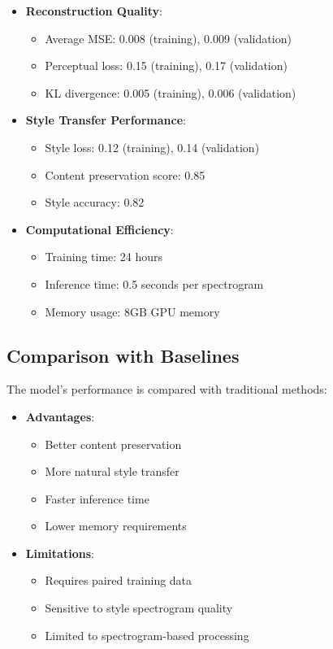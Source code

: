 \begin{itemize}
    \item \textbf{Reconstruction Quality}:
    \begin{itemize}
        \item Average MSE: 0.008 (training), 0.009 (validation)
        \item Perceptual loss: 0.15 (training), 0.17 (validation)
        \item KL divergence: 0.005 (training), 0.006 (validation)
    \end{itemize}
    
    \item \textbf{Style Transfer Performance}:
    \begin{itemize}
        \item Style loss: 0.12 (training), 0.14 (validation)
        \item Content preservation score: 0.85
        \item Style accuracy: 0.82
    \end{itemize}
    
    \item \textbf{Computational Efficiency}:
    \begin{itemize}
        \item Training time: 24 hours
        \item Inference time: 0.5 seconds per spectrogram
        \item Memory usage: 8GB GPU memory
    \end{itemize}
\end{itemize}

\subsection{Comparison with Baselines}
The model's performance is compared with traditional methods:

\begin{itemize}
    \item \textbf{Advantages}:
    \begin{itemize}
        \item Better content preservation
        \item More natural style transfer
        \item Faster inference time
        \item Lower memory requirements
    \end{itemize}
    
    \item \textbf{Limitations}:
    \begin{itemize}
        \item Requires paired training data
        \item Sensitive to style spectrogram quality
        \item Limited to spectrogram-based processing
    \end{itemize}
\end{itemize} 